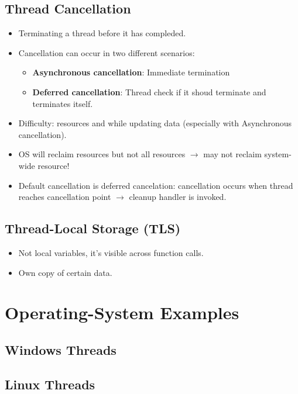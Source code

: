 \documentclass[10pt]{report}
\begin{document}
		\subsection{Thread Cancellation}
			\begin{itemize}
				\item Terminating a thread before it has compleded.
				\item Cancellation can occur in two different scenarios:
				\begin{itemize}
					\item \textbf{Asynchronous cancellation}: Immediate termination
					\item \textbf{Deferred cancellation}: Thread check if it shoud terminate and terminates itself.
				\end{itemize}
				\item Difficulty: resources and while updating data (especially with Asynchronous cancellation).
				\item OS will reclaim resources but not all resources $\rightarrow$ may not reclaim system-wide resource!
				\item Default cancellation is deferred cancelation: cancellation occurs when thread reaches cancellation point $\rightarrow$ cleanup handler is invoked.
			\end{itemize}

		\subsection{Thread-Local Storage (TLS)}
			\begin{itemize}
				\item Not local variables, it's visible across function calls.
				\item Own copy of certain data.
			\end{itemize}

	\section{Operating-System Examples}
		\subsection{Windows Threads}

		\subsection{Linux Threads}
\end{document}
